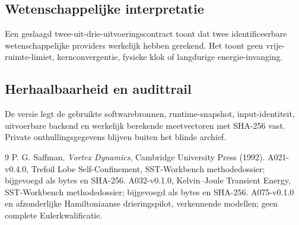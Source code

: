\documentclass[10pt,a4paper]{article}
\begin{document}
\subsection{Wetenschappelijke interpretatie}
Een geslaagd twee-uit-drie-uitvoeringscontract toont dat twee identificeerbare wetenschappelijke providers werkelijk hebben gerekend. Het toont geen vrije-ruimte-limiet, kernconvergentie, fysieke klok of langdurige energie-invanging.
\subsection{Herhaalbaarheid en audittrail}
De versie legt de gebruikte softwarebronnen, runtime-snapshot, input-identiteit, uitvoerbare backend en werkelijk berekende meetvectoren met SHA-256 vast. Private onthullingsgegevens blijven buiten het blinde archief.

\begin{thebibliography}{9}
 P. G. Saffman, \emph{Vortex Dynamics}, Cambridge University Press (1992).
 A021-v0.4.0, Trefoil Lobe Self-Confinement, SST-Workbench methodedossier; bijgevoegd als bytes en SHA-256.
 A032-v0.1.0, Kelvin--Joule Transient Energy, SST-Workbench methodedossier; bijgevoegd als bytes en SHA-256.
 A075-v0.1.0 en afzonderlijke Hamiltoniaanse drieringspilot, verkennende modellen; geen complete Eulerkwalificatie.
\end{thebibliography}
\end{document}
